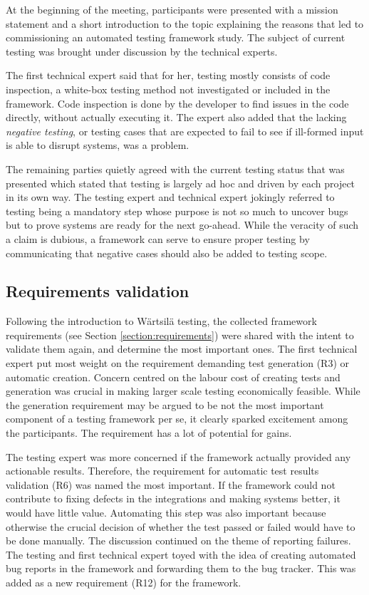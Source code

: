 \documentclass[12pt,a4paper,oneside,pdftex]{report}
\begin{document}
{At the beginning of the meeting, participants were presented with a mission statement and a short introduction to the topic explaining the reasons that led to commissioning an automated testing framework study. The subject of current testing was brought under discussion by the technical experts. 

The first technical expert said that for her, testing mostly consists of code inspection, a white-box testing method not investigated or included in the framework. Code inspection is done by the developer to find issues in the code directly, without actually executing it. The expert also added that the lacking \emph{negative testing}, or testing cases that are expected to fail to see if ill-formed input is able to disrupt systems, was a problem. 

The remaining parties quietly agreed with the current testing status that was presented which stated that testing is largely ad hoc and driven by each project in its own way. The testing expert and technical expert jokingly referred to testing being a mandatory step whose purpose is not so much to uncover bugs but to prove systems are ready for the next go-ahead. While the veracity of such a claim is dubious, a framework can serve to ensure proper testing by communicating that negative cases should also be added to testing scope.

\subsection{Requirements validation}
\label{subsection:requirementsvalidation}

Following the introduction to Wärtsilä testing, the collected framework requirements (see Section \ref{section:requirements}) were shared with the intent to validate them again, and determine the most important ones. The first technical expert put most weight on the requirement demanding test generation (R3) or automatic creation. Concern centred on the labour cost of creating tests and generation was crucial in making larger scale testing economically feasible. While the generation requirement may be argued to be not the most important component of a testing framework per se, it clearly sparked excitement among the participants. The requirement has a lot of potential for gains.

The testing expert was more concerned if the framework actually provided any actionable results. Therefore, the requirement for automatic test results validation (R6) was named the most important. If the framework could not contribute to fixing defects in the integrations and making systems better, it would have little value. Automating this step was also important because otherwise the crucial decision of whether the test passed or failed would have to be done manually. The discussion continued on the theme of reporting failures. The testing and first technical expert toyed with the idea of creating automated bug reports in the framework and forwarding them to the bug tracker. This was added as a new requirement (R12) for the framework.

}
\end{document}
